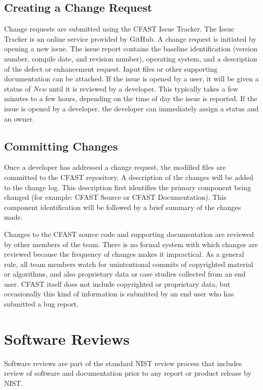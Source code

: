 \documentclass[12pt]{book}
\begin{document}
\subsection{Creating a Change Request}

Change requests are submitted using the CFAST Issue Tracker.  The Issue Tracker is an online service provided by GitHub. A change request is initiated by opening a new issue.  The issue report contains the baseline identification (version number, compile date, and revision number), operating system, and a description of the defect or enhancement request.  Input files or other supporting documentation can be attached. If the issue is opened by a user, it will be given a status of {\em New} until it is reviewed by a developer. This typically takes a few minutes to a few hours, depending on the time of day the issue is reported. If the issue is opened by a developer, the developer can immediately assign a status and an owner.


\subsection{Committing Changes}

Once a developer has addressed a change request, the modified files are committed to the CFAST repository.  A description of the changes will be added to the change log.  This description first identifies the primary component being changed (for example: CFAST Source or CFAST Documentation).  This component identification will be followed by a brief summary of the changes made.

Changes to the CFAST source code and supporting documentation are reviewed by other members of the team. There is no formal system with which changes are reviewed because the frequency of changes makes it impractical. As a general rule, all team members watch for unintentional commits of copyrighted material or algorithms, and also proprietary data or case studies collected from an end user. CFAST itself does not include copyrighted or proprietary data, but occasionally this kind of information is submitted by an end user who has submitted a bug report.

\section{Software Reviews}

Software reviews are  part of the standard NIST review process that includes review of software and documentation prior to any report or product release by NIST.
\end{document}
